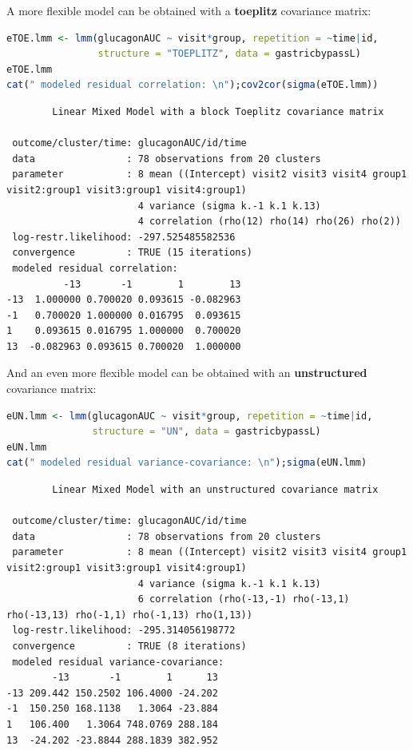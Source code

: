 \documentclass[12pt]{article}
\begin{document}
\noindent A more flexible model can be obtained with a \textbf{toeplitz} covariance matrix:
\begin{lstlisting}[language=r,numbers=none]
eTOE.lmm <- lmm(glucagonAUC ~ visit*group, repetition = ~time|id,
                structure = "TOEPLITZ", data = gastricbypassL)
eTOE.lmm
cat(" modeled residual correlation: \n");cov2cor(sigma(eTOE.lmm))
\end{lstlisting}

\label{}
\begin{verbatim}
		Linear Mixed Model with a block Toeplitz covariance matrix 

 outcome/cluster/time: glucagonAUC/id/time 
 data                : 78 observations from 20 clusters 
 parameter           : 8 mean ((Intercept) visit2 visit3 visit4 group1 visit2:group1 visit3:group1 visit4:group1) 
                       4 variance (sigma k.-1 k.1 k.13) 
                       4 correlation (rho(12) rho(14) rho(26) rho(2)) 
 log-restr.likelihood: -297.525485582536 
 convergence         : TRUE (15 iterations)
 modeled residual correlation: 
          -13       -1        1        13
-13  1.000000 0.700020 0.093615 -0.082963
-1   0.700020 1.000000 0.016795  0.093615
1    0.093615 0.016795 1.000000  0.700020
13  -0.082963 0.093615 0.700020  1.000000
\end{verbatim}

\clearpage

\noindent And an even more flexible model can be obtained with an
\textbf{unstructured} covariance matrix:

\begin{lstlisting}[language=r,numbers=none]
eUN.lmm <- lmm(glucagonAUC ~ visit*group, repetition = ~time|id,
               structure = "UN", data = gastricbypassL)
eUN.lmm
cat(" modeled residual variance-covariance: \n");sigma(eUN.lmm)
\end{lstlisting}

\label{}
\begin{verbatim}
		Linear Mixed Model with an unstructured covariance matrix 

 outcome/cluster/time: glucagonAUC/id/time 
 data                : 78 observations from 20 clusters 
 parameter           : 8 mean ((Intercept) visit2 visit3 visit4 group1 visit2:group1 visit3:group1 visit4:group1) 
                       4 variance (sigma k.-1 k.1 k.13) 
                       6 correlation (rho(-13,-1) rho(-13,1) rho(-13,13) rho(-1,1) rho(-1,13) rho(1,13)) 
 log-restr.likelihood: -295.314056198772 
 convergence         : TRUE (8 iterations)
 modeled residual variance-covariance: 
        -13       -1        1      13
-13 209.442 150.2502 106.4000 -24.202
-1  150.250 168.1138   1.3064 -23.884
1   106.400   1.3064 748.0769 288.184
13  -24.202 -23.8844 288.1839 382.952
\end{verbatim}
\end{document}
